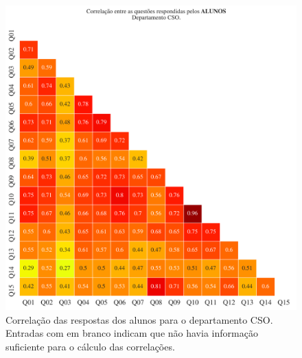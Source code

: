 \documentclass[a4paper,10pt]{article}
\begin{document}
\begin{figure}[h]
\centering
\includegraphics[width=0.999\linewidth]{matriz_corr__CSO_alunos.png}
\caption{\label{fig:corr_alunos}Correlação das respostas dos alunos para o departamento CSO. Entradas com em branco indicam que não havia informação suficiente para o cálculo das correlações.}
\end{figure}
\end{document}
